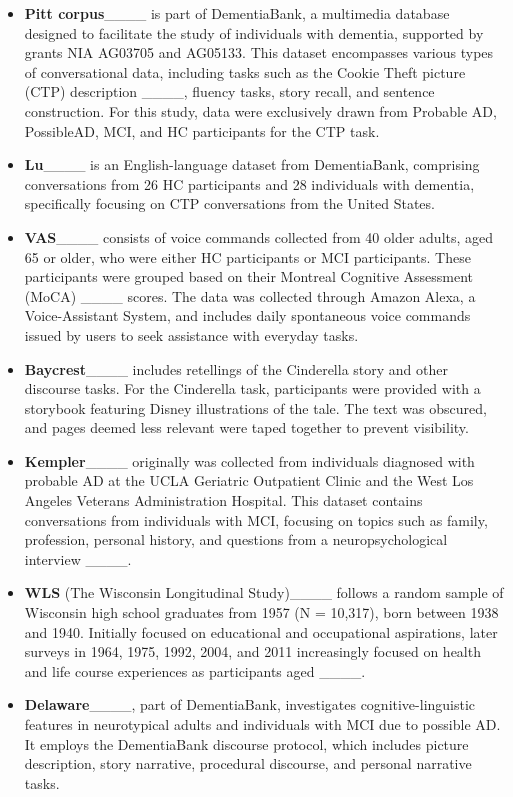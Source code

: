 \begin{itemize}
    \item \textbf{Pitt corpus}____ is part of DementiaBank, a multimedia database designed to facilitate the study of individuals with dementia, supported by grants NIA AG03705 and AG05133. This dataset encompasses various types of conversational data, including tasks such as the Cookie Theft picture (CTP) description ____, fluency tasks, story recall, and sentence construction. For this study, data were exclusively drawn from Probable AD, PossibleAD, MCI, and HC participants for the CTP task.
    \item \textbf{Lu}____ is an English-language dataset from DementiaBank, comprising conversations from 26 HC participants and 28 individuals with dementia, specifically focusing on CTP conversations from the United States.
    \item \textbf{VAS}____ consists of voice commands collected from 40 older adults, aged 65 or older, who were either HC participants or MCI participants. These participants were grouped based on their Montreal Cognitive Assessment (MoCA) ____ scores. The data was collected through Amazon Alexa, a Voice-Assistant System, and includes daily spontaneous voice commands issued by users to seek assistance with everyday tasks. 
    \item \textbf{Baycrest}____ includes retellings of the Cinderella story and other discourse tasks. For the Cinderella task, participants were provided with a storybook featuring Disney illustrations of the tale. The text was obscured, and pages deemed less relevant were taped together to prevent visibility.
    \item \textbf{Kempler}____ originally was collected from individuals diagnosed with probable AD at the UCLA Geriatric Outpatient Clinic and the West Los Angeles Veterans Administration Hospital. This dataset contains  conversations from individuals with MCI, focusing on topics such as family, profession, personal history, and questions from a neuropsychological interview ____.
    \item \textbf{WLS} (The Wisconsin Longitudinal Study)____ follows a random sample of Wisconsin high school graduates from 1957 (N = 10,317), born between 1938 and 1940. Initially focused on educational and occupational aspirations, later surveys in 1964, 1975, 1992, 2004, and 2011 increasingly focused on health and life course experiences as participants aged ____. 
    \item \textbf{Delaware}____, part of DementiaBank, investigates cognitive-linguistic features in neurotypical adults and individuals with MCI due to possible AD. It employs the DementiaBank discourse protocol, which includes picture description, story narrative, procedural discourse, and personal narrative tasks. 

\end{itemize}

